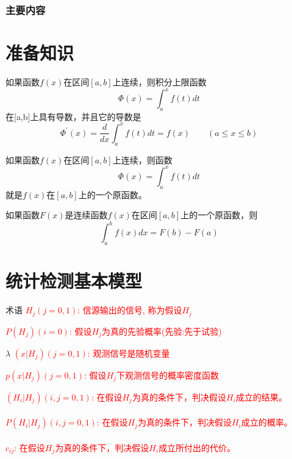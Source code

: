 \begin{frame}
  \frametitle{主要内容}
  \tableofcontents[hideallsubsections]
\end{frame}

\section{准备知识}
\begin{frame}
\begin{theorem}
	如果函数$f(x)$在区间$[a,b]$上连续，则积分上限函数
	\[\Phi(x)=\int_a^x f(t)dt\]
	在[a,b]上具有导数，并且它的导数是
	\[\Phi^\prime(x)=\frac{d}{dx}\int_a^xf(t)dt=f(x)\qquad (a\le x\le b) \]
\end{theorem}
\begin{theorem}
	如果函数$f(x)$在区间$[a,b]$上连续，则函数
	\[\Phi(x)=\int_a^x f(t)dt\]	
	就是$f(x)$在$[a,b]$上的一个原函数。
\end{theorem}
\end{frame}

\begin{frame}
\begin{theorem}
	如果函数$F(x)$是连续函数$f(x)$在区间$[a,b]$上的一个原函数，则
	\[\int_a^b f(x)dx=F(b)-F(a)\]	
\end{theorem}
\end{frame}

\section{统计检测基本模型}

\begin{frame}{术语}
\textcolor{red}{$H_j(j=0,1)$: 信源输出的信号, 称为假设$H_j$}

\bigskip

\textcolor{red}{$P(H_j)(i=0)$: 假设$H_j$为真的先验概率(先验:先于试验)}


\bigskip
$\lambda$
\textcolor{red}{$(x|H_j)(j=0,1)$: 观测信号是随机变量}

\bigskip

\textcolor{red}{$p(x|H_j)(j=0,1)$: 假设$H_j$下观测信号的概率密度函数}

\bigskip

\textcolor{red}{$(H_i|H_j)(i,j=0,1)$: 在假设$H_j$为真的条件下，判决假设$H_i$成立的结果。}\\
~\\
\textcolor{red}{$P(H_i|H_j)(i,j=0,1)$: 在假设$H_j$为真的条件下，判决假设$H_i$成立的概率。}\\
~\\
\textcolor{red}{$c_{ij}$: 在假设$H_j$为真的条件下，判决假设$H_i$成立所付出的代价。}
\end{frame}

